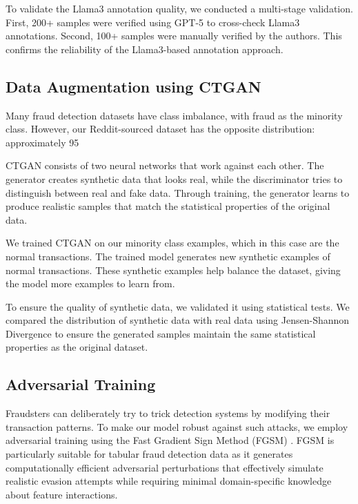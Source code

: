 \documentclass{svproc}
\begin{document}
To validate the Llama3 annotation quality, we conducted a multi-stage validation. First, 200+ samples were verified using GPT-5 to cross-check Llama3 annotations. Second, 100+ samples were manually verified by the authors. This confirms the reliability of the Llama3-based annotation approach.

\subsection{Data Augmentation using CTGAN}
Many fraud detection datasets have class imbalance, with fraud as the minority class. However, our Reddit-sourced dataset has the opposite distribution: approximately 95%

CTGAN consists of two neural networks that work against each other. The generator creates synthetic data that looks real, while the discriminator tries to distinguish between real and fake data. Through training, the generator learns to produce realistic samples that match the statistical properties of the original data.

We trained CTGAN on our minority class examples, which in this case are the normal transactions. The trained model generates new synthetic examples of normal transactions. These synthetic examples help balance the dataset, giving the model more examples to learn from.

To ensure the quality of synthetic data, we validated it using statistical tests. We compared the distribution of synthetic data with real data using Jensen-Shannon Divergence to ensure the generated samples maintain the same statistical properties as the original dataset.

\subsection{Adversarial Training}
Fraudsters can deliberately try to trick detection systems by modifying their transaction patterns. To make our model robust against such attacks, we employ adversarial training using the Fast Gradient Sign Method (FGSM) \cite{madry2018adversarial}. FGSM is particularly suitable for tabular fraud detection data as it generates computationally efficient adversarial perturbations that effectively simulate realistic evasion attempts while requiring minimal domain-specific knowledge about feature interactions.
\end{document}
